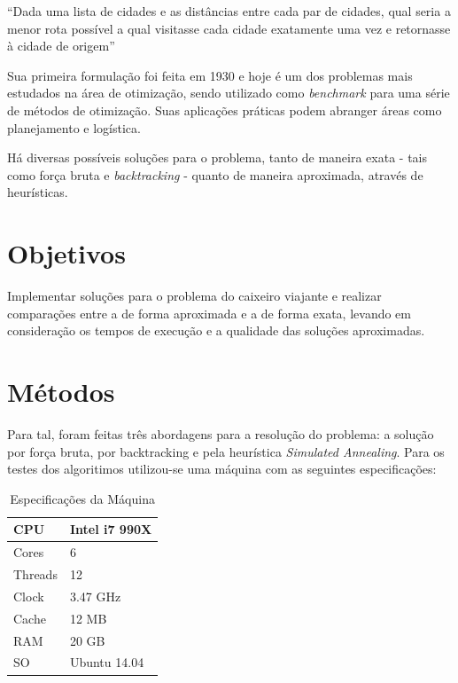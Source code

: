 \documentclass[a4paper, 12pt]{article}
\begin{document}
``Dada uma lista de cidades e as distâncias entre cada par de cidades, qual seria a menor rota possível a qual visitasse cada cidade exatamente uma vez e retornasse à cidade de origem''

Sua primeira formulação foi feita em 1930 e hoje é um dos problemas mais estudados na área de otimização, sendo utilizado como \textit{benchmark} para uma série de métodos de otimização. Suas aplicações práticas podem abranger áreas como planejamento e logística.

Há diversas possíveis soluções para o problema, tanto de maneira exata - tais como força bruta e \textit{backtracking} - quanto de maneira aproximada, através de heurísticas.

\newpage
\section{Objetivos}

Implementar soluções para o problema do caixeiro viajante e realizar comparações entre a de forma aproximada e a de forma exata, levando em consideração os tempos de execução e a qualidade das soluções aproximadas.

\newpage
\section{Métodos}

Para tal, foram feitas três abordagens para a resolução do problema: a solução por força bruta, por backtracking e pela heurística \textit{Simulated Annealing}.
Para os testes dos algoritimos utilizou-se uma máquina com as seguintes especificações:

\begin{table}[h]

\label{tab:cpu}
\centering
\begin{tabular}{| l |  l |}
 \hline
 CPU & Intel i7 990X \\
 \hline
 Cores & 6\\
 \hline
 Threads & 12\\
 \hline
 Clock & 3.47 GHz\\
 \hline
 Cache& 12 MB \\
 \hline
 RAM & 20 GB \\
 \hline
 SO & Ubuntu 14.04 \\
 \hline
\end{tabular}
\caption{Especificações da Máquina}
\end{table}
\end{document}
